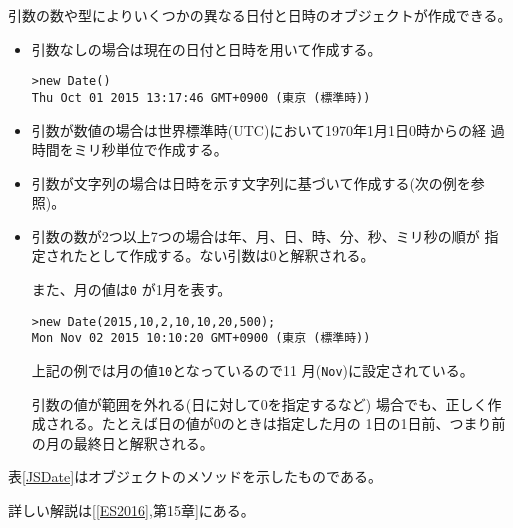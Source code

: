 引数の数や型によりいくつかの異なる日付と日時のオブジェクトが作成できる。
\begin{itemize}
 \item 引数なしの場合は現在の日付と日時を用いて作成する。
\begin{Verbatim}
>new Date()
Thu Oct 01 2015 13:17:46 GMT+0900 (東京 (標準時))
\end{Verbatim}
 \item 引数が数値の場合は世界標準時(UTC)において1970年1月1日0時からの経
       過時間をミリ秒単位で作成する。
 \item 引数が文字列の場合は日時を示す文字列に基づいて作成する(次の例を参照)。
 \item 引数の数が2つ以上7つの場合は年、月、日、時、分、秒、ミリ秒の順が
       指定されたとして作成する。ない引数は0と解釈される。

       また、月の値は\texttt{0} が1月を表す。
\begin{Verbatim}
>new Date(2015,10,2,10,10,20,500);
Mon Nov 02 2015 10:10:20 GMT+0900 (東京 (標準時))
\end{Verbatim}

上記の例では月の値\texttt{10}となっているので11
月(\Verb+Nov+)に設定されている。

       引数の値が範囲を外れる(日に対して0を指定するなど)
       場合でも、正しく作成される。たとえば日の値が0のときは指定した月の
       1日の1日前、つまり前の月の最終日と解釈される。
\end{itemize}
\newpage
表\ref{JSDate}はオブジェクトのメソッドを示したものである。


詳しい解説は[\ref{ES2016},第15章]にある。

%
\clearpage
%
\Answertrue
%
\Answerfalse
\begin{Prob}\upshape

\end{Prob}
